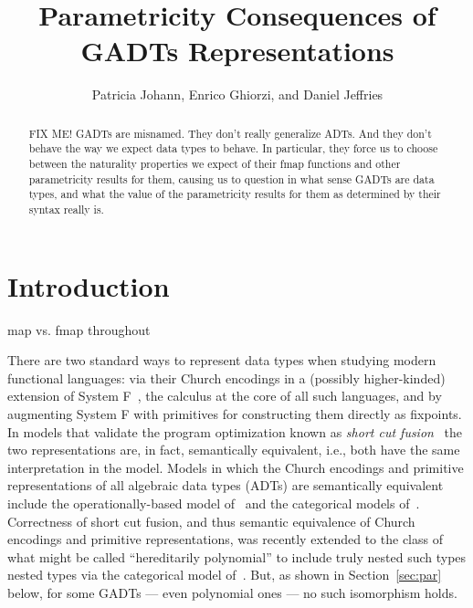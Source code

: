 \documentclass[acmsmall,screen,review,anonymous]{acmart}
\title[Parametricity Consequences of GADTs
  Representations]{Parametricity Consequences of GADTs
  Representations}
\author{Patricia Johann, Enrico Ghiorzi, and Daniel Jeffries}
\affiliation{ \institution{Appalachian State University}}
\theoremstyle{definition}
\begin{document}
\begin{abstract}
{\color{red} FIX ME!} GADTs are misnamed. They don't really generalize
ADTs. And they don't behave the way we expect data types to behave. In
particular, they force us to choose between the naturality properties
we expect of their fmap functions and other parametricity results for
them, causing us to question in what sense GADTs are data types, and
what the value of the parametricity results for them as determined by
their syntax really is.
\end{abstract}

\maketitle

\section{Introduction}
{\color{blue} map vs. fmap throughout} 

There are two standard ways to represent data types when studying
modern functional languages: via their Church encodings in a (possibly
higher-kinded) extension of System F~\cite{gir72}, the calculus at the
core of all such languages, and by augmenting System F
with primitives for constructing them directly as fixpoints.
In models that validate the program optimization known as {\em short
  cut fusion}~\cite{glp93} the two representations are, in fact,
semantically equivalent, i.e., both have the same interpretation in
the model. Models in which the Church encodings and primitive
representations of all algebraic data types (ADTs) are semantically
equivalent include the operationally-based model of~\cite{pit98,pit00}
and the categorical models of~\cite{joh02,joh03}.
Correctness of short cut fusion, and thus semantic equivalence of
Church encodings and primitive representations, was recently extended
to the class of what might be called ``hereditarily polynomial''
{\color{blue} to include truly nested such types} nested types via the
categorical model of~\cite{jgj21}. But, as shown in
Section~\ref{sec:par} below, for some GADTs --- even polynomial ones
--- no such isomorphism holds.
\end{document}
